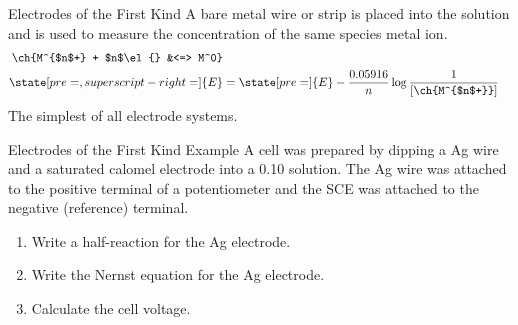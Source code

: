 \documentclass[notes=show]{beamer}
\begin{document}

\begin{frame}{Electrodes of the First Kind}
		A bare metal wire or strip is placed into
			the solution and is used to measure the
			concentration of the same species metal
			ion.
			\begin{align*}
				\ch{M^{$n$+} + $n$\el{} &<=>
				M^0} \\
				\state[pre=,superscript-right=]{E}
				&= \state[pre=]{E} -
				\frac{0.05916}{n} \log
				\frac{1}{[\ch{M^{$n$+}}]}
			\end{align*}
		The simplest of all electrode systems.
\end{frame}


\begin{frame}[t]{Electrodes of the First Kind Example}
	A cell was prepared by dipping a Ag wire and a saturated calomel
	electrode into a \SI{0.10}{\Molar}  solution. The Ag wire was
	attached to the positive terminal of a potentiometer and the SCE was
	attached to the negative (reference) terminal.
	\begin{enumerate}
		\item Write a half-reaction for the Ag electrode.
		\item Write the Nernst equation for the Ag electrode.
		\item Calculate the cell voltage.
			\visible<2->{\textbf{Activity?}}
	\end{enumerate}

\end{frame}
\end{document}
